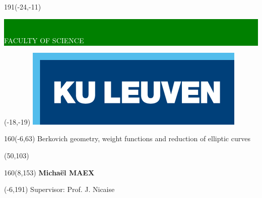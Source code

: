 \thispagestyle{empty}
\newcommand{\form}[1]{\scalebox{1.087}{\boldmath{#1}}}
\sffamily
%
\begin{textblock}{191}(-24,-11)
\colorbox{green}{\hspace{139mm}\ \parbox[c][18truemm]{52mm}{\textcolor{white}{FACULTY OF SCIENCE}}}
\end{textblock}
%
\begin{textblock}{70}(-18,-19)
\textblockcolour{}
\includegraphics*[height=19.8truemm]{figures/LogoKULeuven}
\end{textblock}
%
\begin{textblock}{160}(-6,63)
\textblockcolour{}
\vspace{-\parskip}
\flushleft
\fontsize{40}{42}\selectfont \textcolor{bluetitle}{Berkovich geometry, weight functions and reduction of elliptic curves}\\[1.5mm]
\fontsize{20}{22}\selectfont { } 
\end{textblock}
%
\begin{textblock}{82}(50,103)
\textblockcolour{}
\vspace{-\parskip}
\flushleft
\end{textblock}
%
\begin{textblock}{160}(8,153)
\textblockcolour{}
\vspace{-\parskip}
\flushright
\fontsize{14}{16}\selectfont \textbf{Michaël MAEX}
\end{textblock}
%
\begin{textblock}{70}(-6,191)
\textblockcolour{}
\vspace{-\parskip}
\flushleft
Supervisor: Prof. J. Nicaise\\[-2pt]
\end{textblock}
